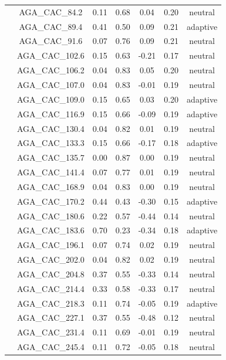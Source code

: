\documentclass[11pt,]{article}
\begin{document}
\begin{longtable}[c]{@{}lcccccc@{}}
& AGA\_CAC\_84.2 & 0.11 & 0.68 & 0.04 & 0.20 & neutral
\\\addlinespace
& AGA\_CAC\_89.4 & 0.41 & 0.50 & 0.09 & 0.21 & adaptive
\\\addlinespace
& AGA\_CAC\_91.6 & 0.07 & 0.76 & 0.09 & 0.21 & neutral
\\\addlinespace
& AGA\_CAC\_102.6 & 0.15 & 0.63 & -0.21 & 0.17 & neutral
\\\addlinespace
& AGA\_CAC\_106.2 & 0.04 & 0.83 & 0.05 & 0.20 & neutral
\\\addlinespace
& AGA\_CAC\_107.0 & 0.04 & 0.83 & -0.01 & 0.19 & neutral
\\\addlinespace
& AGA\_CAC\_109.0 & 0.15 & 0.65 & 0.03 & 0.20 & adaptive
\\\addlinespace
& AGA\_CAC\_116.9 & 0.15 & 0.66 & -0.09 & 0.19 & adaptive
\\\addlinespace
& AGA\_CAC\_130.4 & 0.04 & 0.82 & 0.01 & 0.19 & neutral
\\\addlinespace
& AGA\_CAC\_133.3 & 0.15 & 0.66 & -0.17 & 0.18 & adaptive
\\\addlinespace
& AGA\_CAC\_135.7 & 0.00 & 0.87 & 0.00 & 0.19 & neutral
\\\addlinespace
& AGA\_CAC\_141.4 & 0.07 & 0.77 & 0.01 & 0.19 & neutral
\\\addlinespace
& AGA\_CAC\_168.9 & 0.04 & 0.83 & 0.00 & 0.19 & neutral
\\\addlinespace
& AGA\_CAC\_170.2 & 0.44 & 0.43 & -0.30 & 0.15 & adaptive
\\\addlinespace
& AGA\_CAC\_180.6 & 0.22 & 0.57 & -0.44 & 0.14 & neutral
\\\addlinespace
& AGA\_CAC\_183.6 & 0.70 & 0.23 & -0.34 & 0.18 & adaptive
\\\addlinespace
& AGA\_CAC\_196.1 & 0.07 & 0.74 & 0.02 & 0.19 & neutral
\\\addlinespace
& AGA\_CAC\_202.0 & 0.04 & 0.82 & 0.02 & 0.19 & neutral
\\\addlinespace
& AGA\_CAC\_204.8 & 0.37 & 0.55 & -0.33 & 0.14 & neutral
\\\addlinespace
& AGA\_CAC\_214.4 & 0.33 & 0.58 & -0.33 & 0.17 & neutral
\\\addlinespace
& AGA\_CAC\_218.3 & 0.11 & 0.74 & -0.05 & 0.19 & adaptive
\\\addlinespace
& AGA\_CAC\_227.1 & 0.37 & 0.55 & -0.48 & 0.12 & neutral
\\\addlinespace
& AGA\_CAC\_231.4 & 0.11 & 0.69 & -0.01 & 0.19 & neutral
\\\addlinespace
& AGA\_CAC\_245.4 & 0.11 & 0.72 & -0.05 & 0.18 & neutral

\end{longtable}
\end{document}
